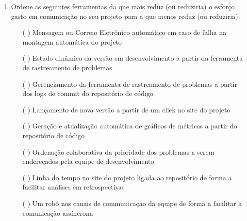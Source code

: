 \begin{enumerate}
\item Ordene as seguintes ferramentas da que mais reduz (ou reduziria)
  o esforço gasto em comunicação no seu projeto para a que menos reduz
  (ou reduziria).
  \begin{itemize}
  \item[( )] Mensagem ou Correio Eletrônico automático em caso de
    falha na montagem automática do projeto
  \item[( )] Estado dinâmico da versão em desenvolvimento a partir da
    ferramenta de rastreamento de problemas
  \item[( )] Gerenciamento da ferramenta de rastreamento de problemas a
    partir dos logs de commit do repositório de código
  \item[( )] Lançamento de nova versão a partir de um click no site do
    projeto
  \item[( )] Geração e atualização automática de gráficos de métricas
    a partir do repositório de código
  \item[( )] Ordenação colaborativa da prioridade dos problemas a
    serem endereçados pela equipe de desenvolvimento
  \item[( )] Linha do tempo no site do projeto ligada ao repositório
    de forma a facilitar análises em retrospectivas
  \item[( )] Um robô nos canais de communicação da equipe de forma a
    facilitar a comunicação assíncrona
  \end{itemize}
\end{enumerate}
